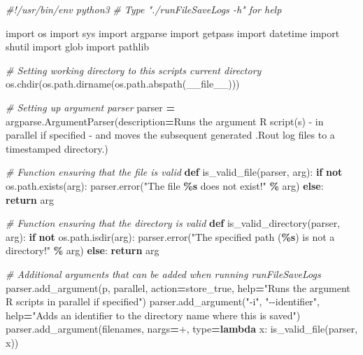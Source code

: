 \documentclass[
]{book}
\newenvironment{Shaded}{\begin{snugshade}}{\end{snugshade}}
\newcommand{\BuiltInTok}[1]{#1}
\newcommand{\CommentTok}[1]{\textcolor[rgb]{0.56,0.35,0.01}{\textit{#1}}}
\newcommand{\ControlFlowTok}[1]{\textcolor[rgb]{0.13,0.29,0.53}{\textbf{#1}}}
\newcommand{\ImportTok}[1]{#1}
\newcommand{\KeywordTok}[1]{\textcolor[rgb]{0.13,0.29,0.53}{\textbf{#1}}}
\newcommand{\NormalTok}[1]{#1}
\newcommand{\OperatorTok}[1]{\textcolor[rgb]{0.81,0.36,0.00}{\textbf{#1}}}
\newcommand{\SpecialCharTok}[1]{\textcolor[rgb]{0.81,0.36,0.00}{\textbf{#1}}}
\newcommand{\StringTok}[1]{\textcolor[rgb]{0.31,0.60,0.02}{#1}}
\newcommand{\VariableTok}[1]{\textcolor[rgb]{0.00,0.00,0.00}{#1}}
\begin{document}
\begin{Shaded}
\begin{Highlighting}[]
\CommentTok{\#!/usr/bin/env python3}
\CommentTok{\# Type "./runFileSaveLogs {-}h" for help}

\ImportTok{import}\NormalTok{ os}
\ImportTok{import}\NormalTok{ sys}
\ImportTok{import}\NormalTok{ argparse}
\ImportTok{import}\NormalTok{ getpass}
\ImportTok{import}\NormalTok{ datetime}
\ImportTok{import}\NormalTok{ shutil}
\ImportTok{import}\NormalTok{ glob}
\ImportTok{import}\NormalTok{ pathlib}

\CommentTok{\# Setting working directory to this script\textquotesingle{}s current directory}
\NormalTok{os.chdir(os.path.dirname(os.path.abspath(}\VariableTok{\_\_file\_\_}\NormalTok{)))}

\CommentTok{\# Setting up argument parser}
\NormalTok{parser }\OperatorTok{=}\NormalTok{ argparse.ArgumentParser(description}\OperatorTok{=}\StringTok{\textquotesingle{}Runs the argument R script(s) {-} in parallel if specified {-} and moves the subsequent generated .Rout log files to a timestamped directory.\textquotesingle{}}\NormalTok{)}

\CommentTok{\# Function ensuring that the file is valid}
\KeywordTok{def}\NormalTok{ is\_valid\_file(parser, arg):}
    \ControlFlowTok{if} \KeywordTok{not}\NormalTok{ os.path.exists(arg):}
\NormalTok{        parser.error(}\StringTok{"The file }\SpecialCharTok{\%s}\StringTok{ does not exist!"} \OperatorTok{\%}\NormalTok{ arg)}
    \ControlFlowTok{else}\NormalTok{:}
        \ControlFlowTok{return}\NormalTok{ arg}

\CommentTok{\# Function ensuring that the directory is valid}
\KeywordTok{def}\NormalTok{ is\_valid\_directory(parser, arg):}
    \ControlFlowTok{if} \KeywordTok{not}\NormalTok{ os.path.isdir(arg):}
\NormalTok{        parser.error(}\StringTok{"The specified path (}\SpecialCharTok{\%s}\StringTok{) is not a directory!"} \OperatorTok{\%}\NormalTok{ arg)}
    \ControlFlowTok{else}\NormalTok{:}
        \ControlFlowTok{return}\NormalTok{ arg}

\CommentTok{\# Additional arguments that can be added when running runFileSaveLogs}
\NormalTok{parser.add\_argument(}\StringTok{\textquotesingle{}{-}p\textquotesingle{}}\NormalTok{, }\StringTok{\textquotesingle{}{-}{-}parallel\textquotesingle{}}\NormalTok{, action}\OperatorTok{=}\StringTok{\textquotesingle{}store\_true\textquotesingle{}}\NormalTok{, }\BuiltInTok{help}\OperatorTok{=}\StringTok{"Runs the argument R scripts in parallel if specified"}\NormalTok{)}
\NormalTok{parser.add\_argument(}\StringTok{"{-}i"}\NormalTok{, }\StringTok{"{-}{-}identifier"}\NormalTok{, }\BuiltInTok{help}\OperatorTok{=}\StringTok{"Adds an identifier to the directory name where this is saved"}\NormalTok{)}
\NormalTok{parser.add\_argument(}\StringTok{\textquotesingle{}filenames\textquotesingle{}}\NormalTok{, nargs}\OperatorTok{=}\StringTok{\textquotesingle{}+\textquotesingle{}}\NormalTok{, }\BuiltInTok{type}\OperatorTok{=}\KeywordTok{lambda}\NormalTok{ x: is\_valid\_file(parser, x))}


\end{Highlighting}
\end{Shaded}
\end{document}
